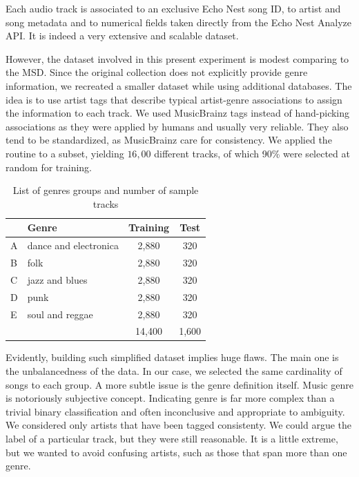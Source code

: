 \documentclass[10pt,twocolumn,letterpaper]{article}
\begin{document}
Each audio track is
associated to an exclusive Echo Nest song ID, to artist and song metadata and
to numerical fields taken directly from the Echo Nest Analyze API. It is indeed
a very extensive and scalable dataset. 
 
However, the dataset involved in this present experiment is  modest
comparing to the MSD. Since the original collection does not
explicitly provide genre information, we recreated a smaller dataset while using 
additional databases. The idea is to use
artist tags that describe typical artist-genre associations to assign the
information to each track. We used MusicBrainz \cite{MusicBrainz} tags instead
of hand-picking associations as they were applied by humans and usually very reliable. They also
tend to be standardized, as MusicBrainz care for consistency. We applied the routine to a subset, yielding
$16,00$ different tracks, of which 90\% were selected at random for training.

\begin{table}[H]
\begin{center}
\caption{List of genres groups and number of sample tracks}
\begin{tabular}{|l|l|c|c|}
\hline
&\textbf{Genre}   	    & Training & Test    \\ \hline
A&dance and electronica & 2,880 	 & 320   \\
B&folk           		& 2,880	     & 320	 \\
C&jazz and blues        & 2,880 	 & 320   \\
D&punk				    & 2,880      & 320   \\
E&soul and reggae       & 2,880	     & 320   \\ \hline
 &					    & 14,400	 & 1,600 \\ \hline
\end{tabular}
\end{center}
\end{table}

Evidently, building such simplified dataset implies huge flaws. The main one is the unbalancedness of the data. In
our case, we selected the same cardinality of songs to each group. A more subtle
issue is the genre definition itself. Music genre is notoriously subjective
concept. Indicating genre is far more complex than a trivial binary
classification and often inconclusive and appropriate to ambiguity.
We considered only artists that have been tagged consistenty. We could argue the
label of a particular track, but they were still reasonable. It is a little
extreme, but we wanted to avoid confusing artists, such as those that span more
than one genre.
\end{document}
